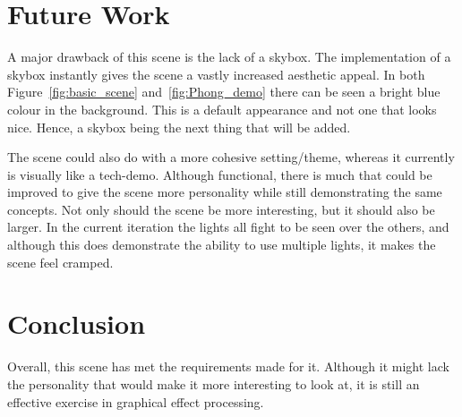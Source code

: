 \documentclass[10pt, a4paper]{article}
\begin{document}
	\section{Future Work}
	A major drawback of this scene is the lack of a skybox.  The implementation of a skybox instantly gives the scene a vastly increased aesthetic appeal.  In both Figure~\ref{fig:basic_scene} and~\ref{fig:Phong_demo} there can be seen a bright blue colour in the background.  This is a default appearance and not one that looks nice.  Hence, a skybox being the next thing that will be added.
	
	The scene could also do with a more cohesive setting/theme, whereas it currently is visually like a tech-demo.  Although functional, there is much that could be improved to give the scene more personality while still demonstrating the same concepts.  Not only should the scene be more interesting, but it should also be larger.  In the current iteration the lights all fight to be seen over the others, and although this does demonstrate the ability to use multiple lights, it makes the scene feel cramped.
	
	
	\section{Conclusion}	
	Overall, this scene has met the requirements made for it.  Although it might lack the personality that would make it more interesting to look at, it is still an effective exercise in graphical effect processing.  
	
%	
%	
		
\end{document}
